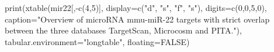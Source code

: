 print(xtable(mir22[,-c(4,5)],
       display=c("d", "s", "f", "s"), digits=c(0,0,5,0),
       caption="Overview of microRNA mmu-miR-22 targets with strict overlap between the three databases TargetScan, Microcosm and PITA."),
       tabular.environment="longtable", floating=FALSE)
